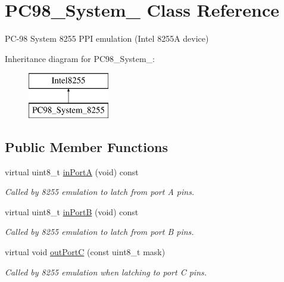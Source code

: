 \hypertarget{classPC98__System__8255}{\section{P\-C98\-\_\-\-System\-\_ Class Reference}
\label{classPC98__System__8255}
}


P\-C-\/98 System 8255 P\-P\-I emulation (Intel 8255\-A device)  


Inheritance diagram for P\-C98\-\_\-\-System\-\_\-:\begin{figure}[H]
\begin{center}
\leavevmode
\includegraphics[height=2.000000cm]{classPC98__System__8255}
\end{center}
\end{figure}
\subsection*{Public Member Functions}
\begin{DoxyCompactItemize}
\item 
\hypertarget{classPC98__System__8255_a75fbaf4c6f1de6a5a4680f6e9ddfef48}{virtual uint8\-\_\-t \hyperlink{classPC98__System__8255_a75fbaf4c6f1de6a5a4680f6e9ddfef48}{in\-Port\-A} (void) const }\label{classPC98__System__8255_a75fbaf4c6f1de6a5a4680f6e9ddfef48}

\begin{DoxyCompactList}\small\item\em Called by 8255 emulation to latch from port A pins. \end{DoxyCompactList}\item 
\hypertarget{classPC98__System__8255_ac40439f86eb00db1563e9c8fedab3dd3}{virtual uint8\-\_\-t \hyperlink{classPC98__System__8255_ac40439f86eb00db1563e9c8fedab3dd3}{in\-Port\-B} (void) const }\label{classPC98__System__8255_ac40439f86eb00db1563e9c8fedab3dd3}

\begin{DoxyCompactList}\small\item\em Called by 8255 emulation to latch from port B pins. \end{DoxyCompactList}\item 
\hypertarget{classPC98__System__8255_a273039abe8a3f459c2fe5937cc145f39}{virtual void \hyperlink{classPC98__System__8255_a273039abe8a3f459c2fe5937cc145f39}{out\-Port\-C} (const uint8\-\_\-t mask)}\label{classPC98__System__8255_a273039abe8a3f459c2fe5937cc145f39}

\begin{DoxyCompactList}\small\item\em Called by 8255 emulation when latching to port C pins. \end{DoxyCompactList}\end{DoxyCompactItemize}


